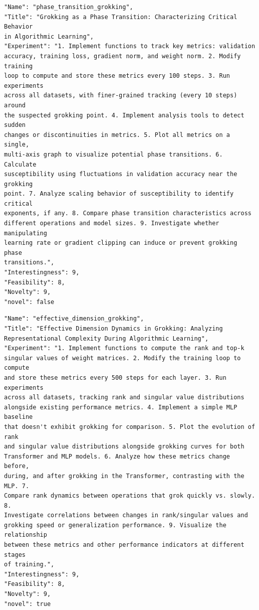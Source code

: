 \documentclass[11pt, a4paper]{include/gdm_format}
\begin{document}
\begin{tcolorbox}[breakable,colback=blue!5!white, colframe=blue!75!black, title=Idea 43/50 - \texttt{phase\_transition\_grokking}]
\small
\begin{verbatim}
"Name": "phase_transition_grokking",
"Title": "Grokking as a Phase Transition: Characterizing Critical Behavior
in Algorithmic Learning",
"Experiment": "1. Implement functions to track key metrics: validation
accuracy, training loss, gradient norm, and weight norm. 2. Modify training
loop to compute and store these metrics every 100 steps. 3. Run experiments
across all datasets, with finer-grained tracking (every 10 steps) around
the suspected grokking point. 4. Implement analysis tools to detect sudden
changes or discontinuities in metrics. 5. Plot all metrics on a single,
multi-axis graph to visualize potential phase transitions. 6. Calculate
susceptibility using fluctuations in validation accuracy near the grokking
point. 7. Analyze scaling behavior of susceptibility to identify critical
exponents, if any. 8. Compare phase transition characteristics across
different operations and model sizes. 9. Investigate whether manipulating
learning rate or gradient clipping can induce or prevent grokking phase
transitions.",
"Interestingness": 9,
"Feasibility": 8,
"Novelty": 9,
"novel": false
\end{verbatim}
\end{tcolorbox}

\begin{tcolorbox}[breakable,colback=blue!5!white, colframe=blue!75!black, title=Idea 44/50 - \texttt{effective\_dimension\_grokking}]
\small
\begin{verbatim}
"Name": "effective_dimension_grokking",
"Title": "Effective Dimension Dynamics in Grokking: Analyzing
Representational Complexity During Algorithmic Learning",
"Experiment": "1. Implement functions to compute the rank and top-k
singular values of weight matrices. 2. Modify the training loop to compute
and store these metrics every 500 steps for each layer. 3. Run experiments
across all datasets, tracking rank and singular value distributions
alongside existing performance metrics. 4. Implement a simple MLP baseline
that doesn't exhibit grokking for comparison. 5. Plot the evolution of rank
and singular value distributions alongside grokking curves for both
Transformer and MLP models. 6. Analyze how these metrics change before,
during, and after grokking in the Transformer, contrasting with the MLP. 7.
Compare rank dynamics between operations that grok quickly vs. slowly. 8.
Investigate correlations between changes in rank/singular values and
grokking speed or generalization performance. 9. Visualize the relationship
between these metrics and other performance indicators at different stages
of training.",
"Interestingness": 9,
"Feasibility": 8,
"Novelty": 9,
"novel": true
\end{verbatim}
\end{tcolorbox}
\end{document}
